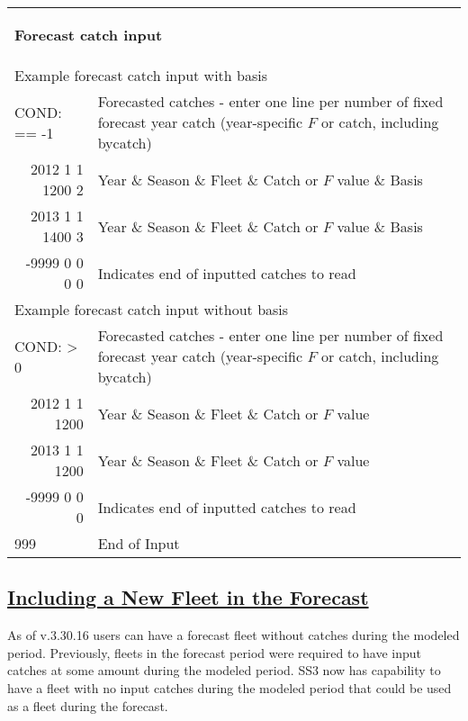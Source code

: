 \begin{landscape}
{\begin{longtable}{p{2cm} p{7cm} p{12cm}}
  \hline
  \multicolumn{3}{l}{\hypertarget{ForecastCatchInput}{\textbf{Forecast catch input}}} \\
  \multicolumn{3}{l}{Example forecast catch input with basis} \\
  \multicolumn{1}{l}{COND: == -1} & \multicolumn{2}{l}{Forecasted catches - enter one line per number of fixed forecast year catch (year-specific $F$ or catch, including bycatch)} \Tstrut\\
  \multicolumn{1}{r}{2012 1 1 1200 2} & \multicolumn{2}{l}{Year \& Season \& Fleet \& Catch or $F$ value \& Basis} \\
  \multicolumn{1}{r}{2013 1 1 1400 3} & \multicolumn{2}{l}{Year \& Season \& Fleet \& Catch or $F$ value \& Basis} \\
  \multicolumn{1}{r}{-9999 0 0 0 0} & \multicolumn{2}{l}{Indicates end of inputted catches to read} \Bstrut\\

  \multicolumn{3}{l}{Example forecast catch input without basis} \\
  \multicolumn{1}{l}{COND: > 0} & \multicolumn{2}{l}{Forecasted catches - enter one line per number of fixed forecast year catch (year-specific $F$ or catch, including bycatch)} \Tstrut\\
  \multicolumn{1}{r}{2012 1 1 1200} & \multicolumn{2}{l}{Year \& Season \& Fleet \& Catch or $F$ value} \\
  \multicolumn{1}{r}{2013 1 1 1200} & \multicolumn{2}{l}{Year \& Season \& Fleet \& Catch or $F$ value} \\
  \multicolumn{1}{r}{-9999 0 0 0} & \multicolumn{2}{l}{Indicates end of inputted catches to read} \Bstrut\\

  \hline
  999 & End of Input & \Bstrut\\

  \end{longtable}}
\end{landscape}

\hypertarget{NewFleetForecast}{}
\subsection[Including a New Fleet in the Forecast]{\protect\hyperlink{NewFleetForecast}{Including a New Fleet in the Forecast}}
As of v.3.30.16 users can have a forecast fleet without catches during the modeled period. Previously, fleets in the forecast period were required to have input catches at some amount during the modeled period. SS3 now has capability to have a fleet with no input catches during the modeled period that could be used as a fleet during the forecast.


